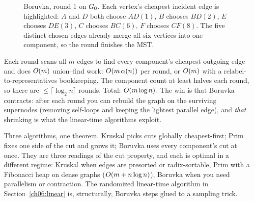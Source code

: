 \begin{figure}[H]
\centering
{}
\caption{Boruvka, round 1 on $G_0$. Each vertex's cheapest incident edge is highlighted: $A$ and $D$ both choose $AD(1)$, $B$ chooses $BD(2)$, $E$ chooses $DE(3)$, $C$ chooses $BC(6)$, $F$ chooses $CF(8)$. The five distinct chosen edges already merge all six vertices into one component, so the round finishes the MST.}
\label{ch06:boruvka-round}
\end{figure}

\begin{complexitybox}
Each round scans all $m$ edges to find every component's cheapest outgoing edge and does $O(m)$ union--find work: $O(m\,\alpha(n))$ per round, or $O(m)$ with a relabel-to-representatives bookkeeping. The component count at least halves each round, so there are $\le\lceil\log_2 n\rceil$ rounds. Total: $O(m\log n)$. The win is that Boruvka contracts: after each round you can rebuild the graph on the surviving supernodes (removing self-loops and keeping the lightest parallel edge), and \emph{that} shrinking is what the linear-time algorithms exploit.
\end{complexitybox}

\begin{aestheticbox}
Three algorithms, one theorem. Kruskal picks cuts globally cheapest-first; Prim fixes one side of the cut and grows it; Boruvka uses every component's cut at once. They are three readings of the cut property, and each is optimal in a different regime: Kruskal when edges are presorted or radix-sortable, Prim with a Fibonacci heap on dense graphs ($O(m+n\log n)$), Boruvka when you need parallelism or contraction. The randomized linear-time algorithm in Section~\ref{ch06:linear} is, structurally, Boruvka steps glued to a sampling trick.
\end{aestheticbox}

